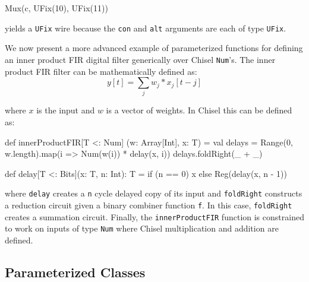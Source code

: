 \documentclass[twocolumn,10pt]{article}
\def\code#1{{\tt #1}}
\begin{document}
\begin{scala}
Mux(c, UFix(10), UFix(11))
\end{scala}

\noindent
yields a \code{UFix} wire because the \code{con} and \code{alt} arguments are each of type \code{UFix}.

% 
% 

We now present a more advanced example of parameterized functions for defining an inner product FIR digital filter generically over Chisel \code{Num}'s.
The inner product FIR filter can be mathematically defined as:
\begin{equation}
y[t] = \sum_j w_j * x_j[t-j]
\end{equation}

\noindent 
where $x$ is the input and $w$ is a vector of weights.
In Chisel this can be defined as:

\begin{scala}
def innerProductFIR[T <: Num] (w: Array[Int], x: T) = {
  val delays = Range(0, w.length).map(i => Num(w(i)) * delay(x, i))
  delays.foldRight(_ + _)
}

def delay[T <: Bits](x: T, n: Int): T =
  if (n == 0) x else Reg(delay(x, n - 1))
\end{scala}
 
\noindent
where 
\code{delay} creates a \code{n} cycle delayed copy of its input and
\code{foldRight} constructs a reduction circuit given a binary combiner function \code{f}.  
In this case, \code{foldRight} creates a summation circuit.
Finally, the \code{innerProductFIR} function is constrained to work on inputs of type \code{Num} where Chisel multiplication and addition are defined.

\subsection{Parameterized Classes}
\end{document}
